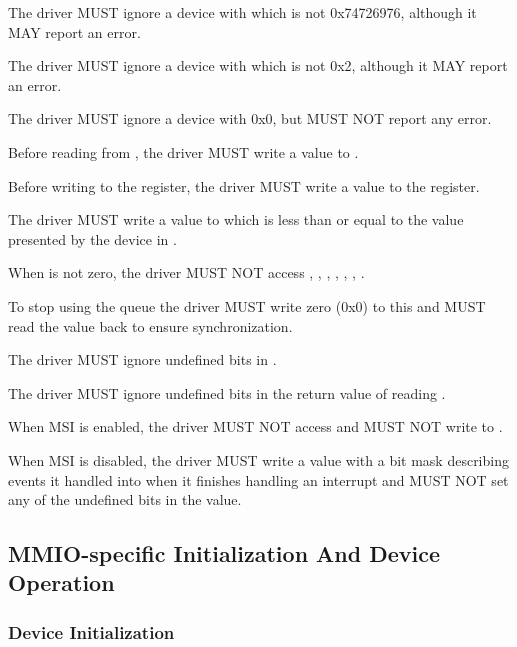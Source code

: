 The driver MUST ignore a device with  which is not 0x74726976,
although it MAY report an error.

The driver MUST ignore a device with  which is not 0x2,
although it MAY report an error.

The driver MUST ignore a device with  0x0,
but MUST NOT report any error.

Before reading from , the driver MUST write a value to .

Before writing to the  register, the driver MUST write a value to the  register.

The driver MUST write a value to  which is less than
or equal to the value presented by the device in .

When  is not zero, the driver MUST NOT access
, , ,
, , , .

To stop using the queue the driver MUST write zero (0x0) to this
 and MUST read the value back to ensure
synchronization.

The driver MUST ignore undefined bits in .

The driver MUST ignore undefined bits in the return value of reading .

When MSI is enabled, the driver MUST NOT access  and MUST NOT write to .

When MSI is disabled, the driver MUST write a value with a bit mask
describing events it handled into  when
it finishes handling an interrupt and MUST NOT set any of the undefined bits in the value.

\subsection{MMIO-specific Initialization And Device Operation}\label{sec:Virtio Transport Options / Virtio Over MMIO / MMIO-specific Initialization And Device Operation}

\subsubsection{Device Initialization}\label{sec:Virtio Transport Options / Virtio Over MMIO / MMIO-specific Initialization And Device Operation / Device Initialization}

